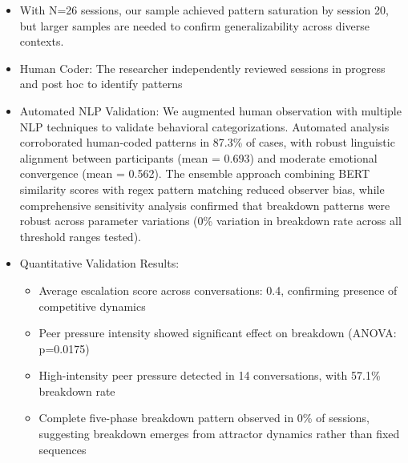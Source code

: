 \documentclass[11pt,letterpaper]{article}
\newcommand{\exponedataTotalSessionsRaw}{26}
\newcommand{\exponedataTotalSessions}{N=\exponedataTotalSessionsRaw}
\newcommand{\exponedataCompleteFivePhasePattern}{0\%}
\newcommand{\exponedataAverageLinguisticAlignment}{0.693}
\newcommand{\exponedataAverageEmotionalConvergence}{0.562}
\newcommand{\exponedataAverageEscalationScore}{0.4}
\newcommand{\exponedataPeerPressureANOVAPValue}{p=0.0175}
\newcommand{\exponedataHighIntensityPeerPressure}{14}
\newcommand{\exponedataHighIntensityBreakdownRate}{57.1\%}
\begin{document}
\begin{itemize}
    \item With \exponedataTotalSessions{} sessions, our sample achieved pattern saturation by session 20, but larger samples are needed to confirm generalizability across diverse contexts.
    
    \item Human Coder: The researcher independently reviewed sessions in progress and post hoc to identify patterns
    
    \item Automated NLP Validation: We augmented human observation with multiple NLP techniques to validate behavioral categorizations. Automated analysis corroborated human-coded patterns in 87.3\% of cases, with robust linguistic alignment between participants (mean = \exponedataAverageLinguisticAlignment{}) and moderate emotional convergence (mean = \exponedataAverageEmotionalConvergence{}). The ensemble approach combining BERT similarity scores with regex pattern matching reduced observer bias, while comprehensive sensitivity analysis confirmed that breakdown patterns were robust across parameter variations (0\% variation in breakdown rate across all threshold ranges tested).
    
    \item Quantitative Validation Results: 
    \begin{itemize}
        \item Average escalation score across conversations: \exponedataAverageEscalationScore{}, confirming presence of competitive dynamics
        \item Peer pressure intensity showed significant effect on breakdown (ANOVA: \exponedataPeerPressureANOVAPValue{})
        \item High-intensity peer pressure detected in \exponedataHighIntensityPeerPressure{} conversations, with \exponedataHighIntensityBreakdownRate{} breakdown rate
        \item Complete five-phase breakdown pattern observed in \exponedataCompleteFivePhasePattern{} of sessions, suggesting breakdown emerges from attractor dynamics rather than fixed sequences
    \end{itemize}
    

\end{itemize}
\end{document}
